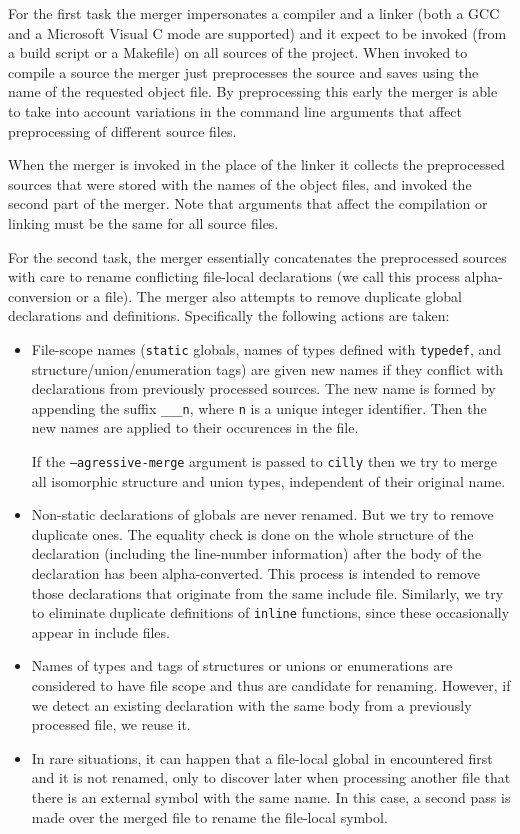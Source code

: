 \documentclass{article}
\def\t#1{{\tt #1}}
\begin{document}
 For the first task the merger impersonates a compiler and a linker (both a
GCC and a Microsoft Visual C mode are supported) and it expect to be invoked
(from a build script or a Makefile) on all sources of the project. When
invoked to compile a source the merger just preprocesses the source and
saves using the name of the requested object file. By preprocessing this early
the merger is able to take into account variations in the command line
arguments that affect preprocessing of different source files. 

 When the merger is invoked in the place of the linker it collects the
preprocessed sources that were stored with the names of the object files, and
invoked the second part of the merger. Note that arguments that affect the
compilation or linking must be the same for all source files.

 For the second task, the merger essentially concatenates the preprocessed
sources with care to rename conflicting file-local declarations (we call this
process alpha-conversion or a file). The merger also attempts to remove
duplicate global declarations and definitions. Specifically the following
actions are taken: 

\begin{itemize}
\item File-scope names (\t{static} globals, names of types defined with
\t{typedef}, and structure/union/enumeration tags) are given new names if they
conflict with declarations from previously processed sources. The new name is
formed by appending the suffix \t{\_\_\_n}, where \t{n} is a unique integer
identifier. Then the new names are applied to their occurences in the file. 

 If the \t{--agressive-merge} argument is passed to \t{cilly} then we try to
merge all isomorphic structure and union types, independent of their original
name. 

\item Non-static declarations of globals are never renamed. But we try to
remove duplicate ones. The equality check is done on the whole structure of
the declaration (including the line-number information) after the body of the
declaration has been alpha-converted. This process is intended to remove those
declarations that originate from the same include file. Similarly, we try to
eliminate duplicate definitions of \t{inline} functions, since these
occasionally appear in include files.

\item Names of types and tags of structures or unions or enumerations are
considered to have file scope and thus are candidate for renaming. However, if
we detect an existing declaration with the same body from a previously
processed file, we reuse it.

\item In rare situations, it can happen that a file-local global in
encountered first and it is not renamed, only to discover later when
processing another file that there is an external symbol with the same name.
In this case, a second pass is made over the merged file to rename the
file-local symbol. 
\end{itemize}
\end{document}
